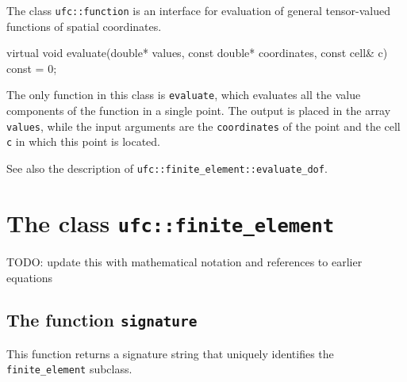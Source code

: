 





The class \texttt{ufc::function} is an interface for evaluation of
general tensor-valued functions of spatial coordinates.

\begin{code}
virtual void evaluate(double* values,
                      const double* coordinates,
                      const cell& c) const = 0;
\end{code}

The only function in this class is \texttt{evaluate},
which evaluates all the value components of the function in a single point.
The output is placed in the array \texttt{values},
while the input arguments are the \texttt{coordinates} of the point
and the cell \texttt{c} in which this point is located.

See also the description of \texttt{ufc::finite\_element::evaluate\_dof}.


\section{The class \texttt{ufc::finite\_element}}

TODO: update this with mathematical notation and references to earlier equations






\subsection{The function \texttt{signature}}
This function returns a signature string that uniquely identifies the \texttt{finite\_element} subclass.

